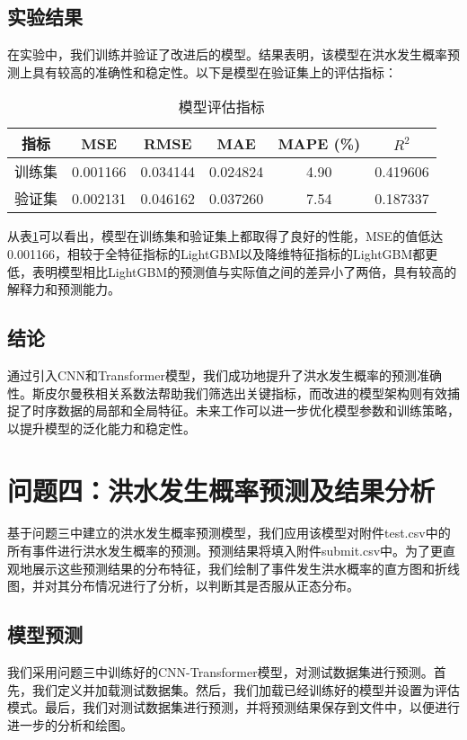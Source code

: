 \documentclass[withoutpreface,bwprint]{cumcmthesis} %
\begin{document}
\subsection{实验结果}
在实验中，我们训练并验证了改进后的模型。结果表明，该模型在洪水发生概率预测上具有较高的准确性和稳定性。以下是模型在验证集上的评估指标：


\begin{table}[htbp]
	\centering
	\caption{模型评估指标}
	\begin{tabular}{cccccc}
		\toprule
		指标 & MSE & RMSE & MAE & MAPE (\%) & $R^2$ \\
		\midrule
		训练集 & 0.001166 & 0.034144 & 0.024824 & 4.90 & 0.419606 \\
		验证集 & 0.002131 & 0.046162 & 0.037260 & 7.54 & 0.187337 \\
		\bottomrule
	\end{tabular}
	\label{tab:results}
\end{table}

从表\ref{tab:results}可以看出，模型在训练集和验证集上都取得了良好的性能，MSE的值低达0.001166，相较于全特征指标的LightGBM以及降维特征指标的LightGBM都更低，表明模型相比LightGBM的预测值与实际值之间的差异小了两倍，具有较高的解释力和预测能力。

\subsection{结论}
通过引入CNN和Transformer模型，我们成功地提升了洪水发生概率的预测准确性。斯皮尔曼秩相关系数法帮助我们筛选出关键指标，而改进的模型架构则有效捕捉了时序数据的局部和全局特征。未来工作可以进一步优化模型参数和训练策略，以提升模型的泛化能力和稳定性。\cite{bib:four}

\section{问题四：洪水发生概率预测及结果分析}

基于问题三中建立的洪水发生概率预测模型，我们应用该模型对附件test.csv中的所有事件进行洪水发生概率的预测。预测结果将填入附件submit.csv中。为了更直观地展示这些预测结果的分布特征，我们绘制了事件发生洪水概率的直方图和折线图，并对其分布情况进行了分析，以判断其是否服从正态分布。

\subsection{模型预测}
我们采用问题三中训练好的CNN-Transformer模型，对测试数据集进行预测。首先，我们定义并加载测试数据集。然后，我们加载已经训练好的模型并设置为评估模式。最后，我们对测试数据集进行预测，并将预测结果保存到文件中，以便进行进一步的分析和绘图。
\end{document}
